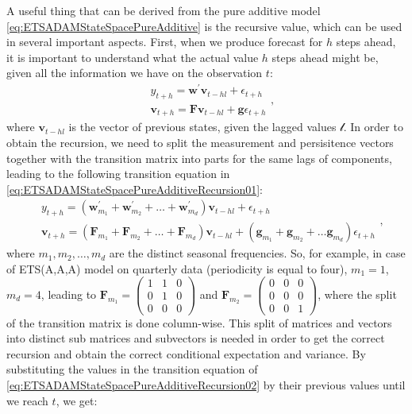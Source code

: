 \documentclass[
]{book}
\theoremstyle{definition}
\theoremstyle{definition}
\theoremstyle{definition}
\theoremstyle{definition}
\theoremstyle{remark}
\begin{document}
A useful thing that can be derived from the pure additive model \eqref{eq:ETSADAMStateSpacePureAdditive} is the recursive value, which can be used in several important aspects. First, when we produce forecast for \(h\) steps ahead, it is important to understand what the actual value \(h\) steps ahead might be, given all the information we have on the observation \(t\):
\begin{equation}
  \begin{aligned}
    & {y}_{t+h} = \mathbf{w}^\prime \mathbf{v}_{t-h{l}} + \epsilon_{t+h} \\
    & \mathbf{v}_{t+h} = \mathbf{F} \mathbf{v}_{t-h{l}} + \mathbf{g} \epsilon_{t+h}
  \end{aligned},
  \label{eq:ETSADAMStateSpacePureAdditiveRecursion01}
\end{equation}
where \(\mathbf{v}_{t-h{l}}\) is the vector of previous states, given the lagged values \(\boldsymbol{\mathscr{l}}\). In order to obtain the recursion, we need to split the measurement and persisitence vectors together with the transition matrix into parts for the same lags of components, leading to the following transition equation in \eqref{eq:ETSADAMStateSpacePureAdditiveRecursion01}:
\begin{equation}
  \begin{aligned}
    & {y}_{t+h} = (\mathbf{w}_{m_1}^\prime + \mathbf{w}_{m_2}^\prime + \dots + \mathbf{w}_{m_d}^\prime) \mathbf{v}_{t-h{l}} + \epsilon_{t+h} \\
    & \mathbf{v}_{t+h} = (\mathbf{F}_{m_1} + \mathbf{F}_{m_2} + \dots + \mathbf{F}_{m_d}) \mathbf{v}_{t-h{l}} + (\mathbf{g}_{m_1} + \mathbf{g}_{m_2} + \dots \mathbf{g}_{m_d}) \epsilon_{t+h}
  \end{aligned},
  \label{eq:ETSADAMStateSpacePureAdditiveRecursion02}
\end{equation}
where \(m_1, m_2, \dots, m_d\) are the distinct seasonal frequencies. So, for example, in case of ETS(A,A,A) model on quarterly data (periodicity is equal to four), \(m_1=1\), \(m_d=4\), leading to \(\mathbf{F}_{m_1} = \begin{pmatrix} 1 & 1 & 0 \\ 0 & 1 & 0 \\ 0 & 0 & 0 \end{pmatrix}\) and \(\mathbf{F}_{m_2} = \begin{pmatrix} 0 & 0 & 0 \\ 0 & 0 & 0 \\ 0 & 0 & 1 \end{pmatrix}\), where the split of the transition matrix is done column-wise. This split of matrices and vectors into distinct sub matrices and subvectors is needed in order to get the correct recursion and obtain the correct conditional expectation and variance. By substituting the values in the transition equation of \eqref{eq:ETSADAMStateSpacePureAdditiveRecursion02} by their previous values until we reach \(t\), we get:
\end{document}
